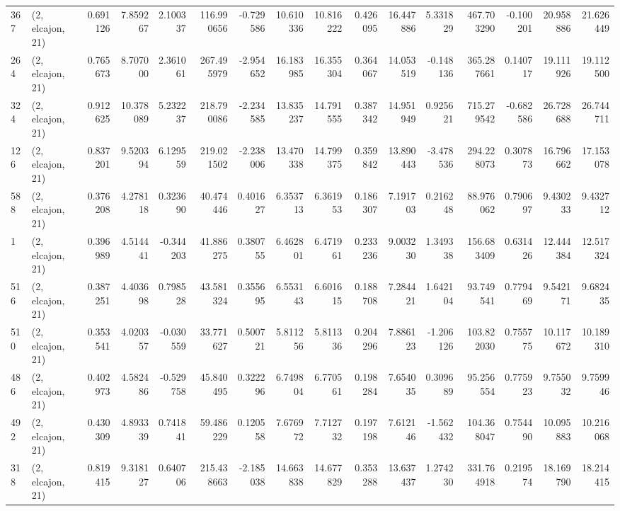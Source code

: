 \begin{tabular}{llrrrrrrrrrrrrrr}
367 &  (2, elcajon, 21) &   0.691126 &   7.859267 &   2.100337 &   116.990656 &  -0.729586 &  10.610336 &  10.816222 &  0.426095 &  16.447886 &   5.331829 &    467.703290 &  -0.100201 &  20.958886 &   21.626449 \\
264 &  (2, elcajon, 21) &   0.765673 &   8.707000 &   2.361061 &   267.495979 &  -2.954652 &  16.183985 &  16.355304 &  0.364067 &  14.053519 &  -0.148136 &    365.287661 &   0.140717 &  19.111926 &   19.112500 \\
324 &  (2, elcajon, 21) &   0.912625 &  10.378089 &   5.232237 &   218.790086 &  -2.234585 &  13.835237 &  14.791555 &  0.387342 &  14.951949 &   0.925621 &    715.279542 &  -0.682586 &  26.728688 &   26.744711 \\
126 &  (2, elcajon, 21) &   0.837201 &   9.520394 &   6.129559 &   219.021502 &  -2.238006 &  13.470338 &  14.799375 &  0.359842 &  13.890443 &  -3.478536 &    294.228073 &   0.307873 &  16.796662 &   17.153078 \\
588 &  (2, elcajon, 21) &   0.376208 &   4.278118 &   0.323690 &    40.474446 &   0.401627 &   6.353713 &   6.361953 &  0.186307 &   7.191703 &   0.216248 &     88.976062 &   0.790697 &   9.430233 &    9.432712 \\
1   &  (2, elcajon, 21) &   0.396989 &   4.514441 &  -0.344203 &    41.886275 &   0.380755 &   6.462801 &   6.471961 &  0.233236 &   9.003230 &   1.349338 &    156.683409 &   0.631426 &  12.444384 &   12.517324 \\
516 &  (2, elcajon, 21) &   0.387251 &   4.403698 &   0.798528 &    43.581324 &   0.355695 &   6.553143 &   6.601615 &  0.188708 &   7.284421 &   1.642104 &     93.749541 &   0.779469 &   9.542171 &    9.682435 \\
510 &  (2, elcajon, 21) &   0.353541 &   4.020357 &  -0.030559 &    33.771627 &   0.500721 &   5.811256 &   5.811336 &  0.204296 &   7.886123 &  -1.206126 &    103.822030 &   0.755775 &  10.117672 &   10.189310 \\
486 &  (2, elcajon, 21) &   0.402973 &   4.582486 &  -0.529758 &    45.840495 &   0.322296 &   6.749804 &   6.770561 &  0.198284 &   7.654035 &   0.309689 &     95.256554 &   0.775923 &   9.755032 &    9.759946 \\
492 &  (2, elcajon, 21) &   0.430309 &   4.893339 &   0.741841 &    59.486229 &   0.120558 &   7.676972 &   7.712732 &  0.197198 &   7.612146 &  -1.562432 &    104.368047 &   0.754490 &  10.095883 &   10.216068 \\
318 &  (2, elcajon, 21) &   0.819415 &   9.318127 &   0.640706 &   215.438663 &  -2.185038 &  14.663838 &  14.677829 &  0.353288 &  13.637437 &   1.274230 &    331.764918 &   0.219574 &  18.169790 &   18.214415 \\

\end{tabular}
